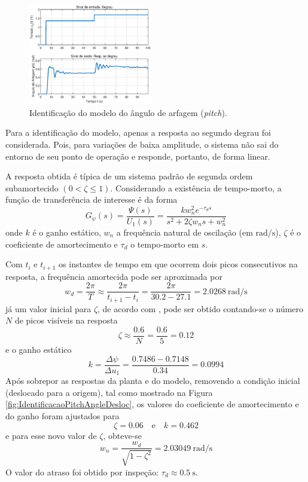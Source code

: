\begin{figure}[H]
    \centering
    \includegraphics[width=0.48\textwidth]{figures/Identificacao/IdentificaPitchInicial.eps}
    \caption{Identificação do modelo do ângulo de arfagem (\textit{pitch}).}
    \label{fig:IdentificacaoPitchAngle}
\end{figure}

Para a identificação do modelo, apenas a resposta ao segundo degrau foi considerada. Pois, para variações de baixa amplitude, o sistema não sai do entorno de seu ponto de operação e responde, portanto, de forma linear. 

A resposta obtida é típica de um sistema padrão de segunda ordem subamortecido $( 0 < \zeta \leq 1)$. Considerando a existência de tempo-morto, a função de transferência de interesse é da forma
\begin{equation}\label{eq:FTPitch}
    G_{\psi}(s) = \frac{\Psi(s)}{U_{1}(s)} = \frac{k w_{n}^2 e^{-\tau_d s}}{s^2 + 2 \zeta w_{n} s + w_{n}^2}
\end{equation}
\noindent onde $k$ é o ganho estático, $w_n$ a frequência natural de oscilação (em $\si{\radian/\s}$), $\zeta$ é o coeficiente de amortecimento e $\tau_d$ o tempo-morto em $\si{s}$.

Com $t_{i}$ e $t_{i+1}$ os instantes de tempo em que ocorrem dois picos consecutivos na resposta, a frequência amortecida pode ser aproximada por
$$ w_d = \frac{2 \pi}{T} \approx \frac{2 \pi}{t_{i+1} - t_i} = \frac{2 \pi}{30.2 - 27.1} = \SI{2.0268}{\radian/\s} $$
\noindent já um valor inicial para $\zeta$, de acordo com \cite{aguirre2004}, pode ser obtido contando-se o número $N$ de picos visíveis na resposta
$$ \zeta \approx \frac{0.6}{N} = \frac{0.6}{5} = 0.12 $$
\noindent e o ganho estático
$$ k = \frac{\Delta \psi}{\Delta u_{1}} = \frac{0.7486 - 0.7148}{0.34} = 0.0994 $$
Após sobrepor as respostas da planta e do modelo, removendo a condição inicial (deslocado para a origem), tal como mostrado na Figura \ref{fig:IdentificacaoPitchAngleDesloc}, os valores do coeficiente de amortecimento e do ganho foram ajustados para
$$ \zeta = 0.06 \quad\text{e}\quad k = 0.462 $$
e para esse novo valor de $\zeta$, obteve-se
$$ w_{n} = \frac{w_{d}}{\sqrt{1 - \zeta^2}} = \SI{2.03049}{\radian/\s} $$
O valor do atraso foi obtido por inspeção: $\tau_{d} \approx \SI{0.5}{\s}$.

